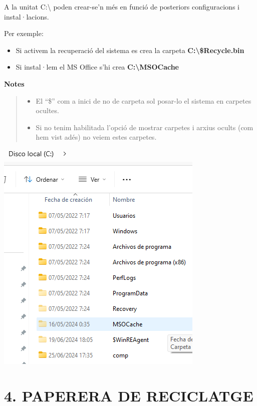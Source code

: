 \documentclass[
  a4paper,
]{article}
\providecommand{\tightlist}{%
  \setlength{\itemsep}{0pt}\setlength{\parskip}{0pt}}
\begin{document}
A la unitat C:\textbackslash{} poden crear-se'n més en funció de
posteriors configuracions i instal·lacions.

Per exemple:

\begin{itemize}
\tightlist
\item
  Si activem la recuperació del sistema es crea la carpeta
  \textbf{C:\textbackslash\$Recycle.bin}
\item
  Si instal·lem el MS Office s'hi crea
  \textbf{C:\textbackslash MSOCache}
\end{itemize}

\textbf{Notes}

\begin{quote}
\begin{itemize}
\tightlist
\item
  El ``\$'' com a inici de no de carpeta sol posar-lo el sistema en
  carpetes ocultes.
\item
  Si no tenim habilitada l'opció de mostrar carpetes i arxius ocults
  (com hem vist adés) no veiem estes carpetes.
\end{itemize}
\end{quote}

\includegraphics{png/carpetesPrincipalsCreadesDespres.png}

\section{4. PAPERERA DE RECICLATGE}\label{paperera-de-reciclatge}
\end{document}
